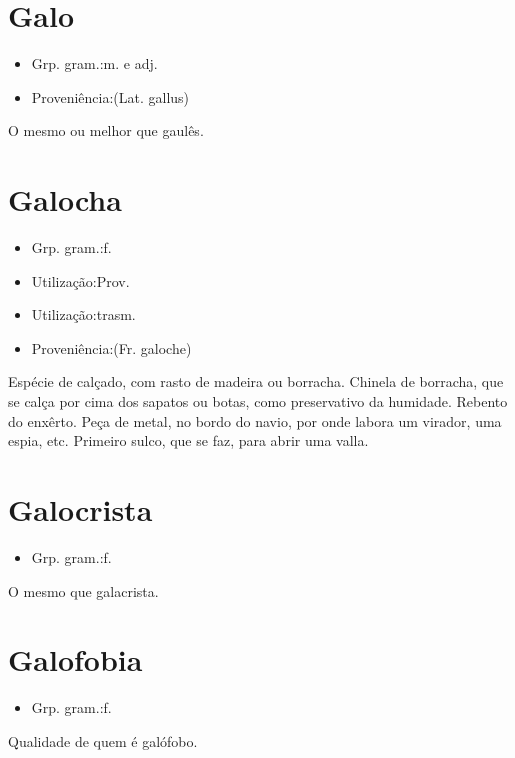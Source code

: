 \section{Galo}
\begin{itemize}
\item {Grp. gram.:m.  e  adj.}
\end{itemize}
\begin{itemize}
\item {Proveniência:(Lat. \textunderscore gallus\textunderscore )}
\end{itemize}
O mesmo ou melhor que \textunderscore gaulês\textunderscore .
\section{Galocha}
\begin{itemize}
\item {Grp. gram.:f.}
\end{itemize}
\begin{itemize}
\item {Utilização:Prov.}
\end{itemize}
\begin{itemize}
\item {Utilização:trasm.}
\end{itemize}
\begin{itemize}
\item {Proveniência:(Fr. \textunderscore galoche\textunderscore )}
\end{itemize}
Espécie de calçado, com rasto de madeira ou borracha.
Chinela de borracha, que se calça por cima dos sapatos ou botas, como preservativo da humidade.
Rebento do enxêrto.
Peça de metal, no bordo do navio, por onde labora um virador, uma espia, etc.
Primeiro sulco, que se faz, para abrir uma valla.
\section{Galocrista}
\begin{itemize}
\item {Grp. gram.:f.}
\end{itemize}
O mesmo que \textunderscore galacrista\textunderscore .
\section{Galofobia}
\begin{itemize}
\item {Grp. gram.:f.}
\end{itemize}
Qualidade de quem é galófobo.
